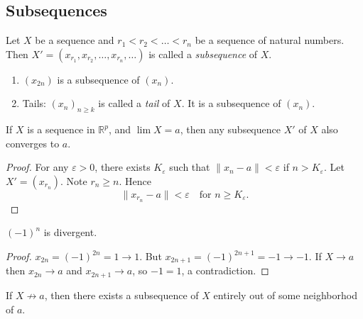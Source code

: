 \subsection{Subsequences}

\begin{definition}[Subsequence]
	Let $X$ be a sequence and $r_1 < r_2 <\ldots<r_n$ be a sequence of natural numbers.
	Then $X' = (x_{r_1}, x_{r_2}, \ldots,x_{r_n},\ldots)$ is called a \textit{subsequence} of $X$.
\end{definition}

\begin{example}
	\begin{enumerate}
		\item $(x_{2n})$ is a subsequence of $(x_n)$.
		\item Tails: $(x_n)_{n\ge k}$ is called a \textit{tail} of $X$. It is a subsequence of $(x_n)$.
	\end{enumerate}
\end{example}

\begin{theorem}
	If $X$ is a sequence in $\mathbb{R}^p$, and $\lim X = a$, then any subsequence $X'$ of $X$ also converges to $a$.
\end{theorem}
\begin{proof}
	For any $\varepsilon>0$, there exists $K_\varepsilon$ such that $\|x_n - a\|<\varepsilon$ if $n > K_\varepsilon$. 
	Let $X' = (x_{r_n})$. Note $r_n \ge n$. Hence \[
		\|x_{r_n} - a\|<\varepsilon \quad \text{for } n\ge K_\varepsilon
	.\] 
\end{proof}

\begin{example}
	$(-1)^n$ is divergent.
	\begin{proof}
		$x_{2n} = (-1)^{2n} = 1 \to  1$. But $x_{2n+1} = (-1)^{2n+1}= -1 \to -1$. If $X \to a$ then $x_{2n} \to a$ and $x_{2n+1}\to a$, so $-1 = 1$, a contradiction.
	\end{proof}
\end{example}

\begin{proposition}
	If $X \not \to a$, then there exists a subsequence of $X$ entirely out of some neighborhod of $a$.
\end{proposition}

